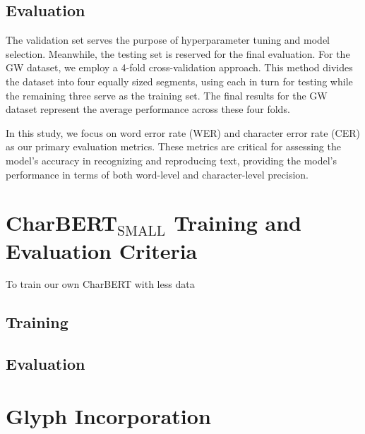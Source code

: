 \subsection{Evaluation}
\label{subsec:3_evaluation}
The validation set serves the purpose of hyperparameter tuning and model selection. Meanwhile, the testing set is reserved for the final evaluation. For the GW dataset, we employ a 4-fold cross-validation approach. This method divides the dataset into four equally sized segments, using each in turn for testing while the remaining three serve as the training set. The final results for the GW dataset represent the average performance across these four folds.

In this study, we focus on word error rate (WER) and character error rate (CER) as our primary evaluation metrics. These metrics are critical for assessing the model's accuracy in recognizing and reproducing text, providing the model's performance in terms of both word-level and character-level precision.

\section{CharBERT$_{\text{SMALL}}$ Training and Evaluation Criteria}
\label{sec:3_charbert_training_and_evaluation_criteria}
To train our own CharBERT with less data
\subsection{Training}
\label{subsec:3_training_details}
\subsection{Evaluation}
\label{subsec:3_evaluation}
\section{Glyph Incorporation}
\label{sec:3_glyph_incorporation}
